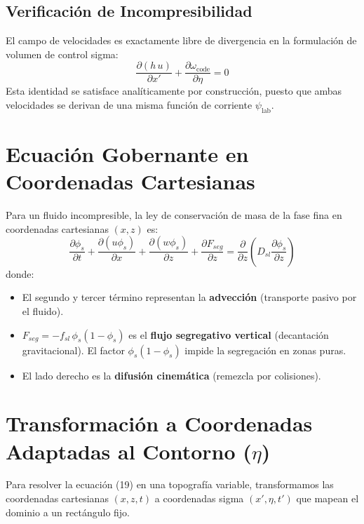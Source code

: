 \documentclass[11pt,a4paper]{article}
\begin{document}
\subsection{Verificación de Incompresibilidad}
El campo de velocidades es exactamente libre de divergencia en la formulación de volumen de control sigma:
\begin{equation}
    \frac{\partial (h \, u)}{\partial x'} + \frac{\partial \omega_{\text{code}}}{\partial \eta} = 0
\end{equation}
Esta identidad se satisface analíticamente por construcción, puesto que ambas velocidades se derivan de una misma función de corriente $\psi_{\text{lab}}$.


\section{Ecuación Gobernante en Coordenadas Cartesianas}
Para un fluido incompresible, la ley de conservación de masa de la fase fina en coordenadas cartesianas $(x, z)$ es:
\begin{equation}
    \frac{\partial \phi_s}{\partial t} + \frac{\partial (u \phi_s)}{\partial x} + \frac{\partial (w \phi_s)}{\partial z} + \frac{\partial F_{seg}}{\partial z} = \frac{\partial}{\partial z} \left( D_{sl} \frac{\partial \phi_s}{\partial z} \right)
\end{equation}
donde:
\begin{itemize}
    \item El segundo y tercer término representan la \textbf{advección} (transporte pasivo por el fluido).
    \item $F_{seg} = -f_{sl} \, \phi_s(1-\phi_s)$ es el \textbf{flujo segregativo vertical} (decantación gravitacional). El factor $\phi_s(1-\phi_s)$ impide la segregación en zonas puras.
    \item El lado derecho es la \textbf{difusión cinemática} (remezcla por colisiones).
\end{itemize}

\section{Transformación a Coordenadas Adaptadas al Contorno ($\eta$)}
Para resolver la ecuación (19) en una topografía variable, transformamos las coordenadas cartesianas $(x, z, t)$ a coordenadas sigma $(x', \eta, t')$ que mapean el dominio a un rectángulo fijo.
\end{document}
